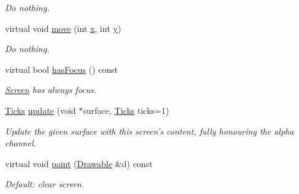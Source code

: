 \begin{DoxyCompactItemize}
\begin{DoxyCompactList}\small\item\em Do nothing. \end{DoxyCompactList}\item 
\hypertarget{classGUI_1_1Screen_a48a3586ad675d415de2baa45a5cf382d}{virtual void \hyperlink{classGUI_1_1Screen_a48a3586ad675d415de2baa45a5cf382d}{move} (int \hyperlink{classGUI_1_1Window_a6ca6a80ca00c9e1d8ceea8d3d99a657d}{x}, int \hyperlink{classGUI_1_1Window_a0ee8e923aff2c3661fc2e17656d37adf}{y})}\label{classGUI_1_1Screen_a48a3586ad675d415de2baa45a5cf382d}

\begin{DoxyCompactList}\small\item\em Do nothing. \end{DoxyCompactList}\item 
\hypertarget{classGUI_1_1Screen_a9bcce98285a1d8e359c2f81099697184}{virtual bool \hyperlink{classGUI_1_1Screen_a9bcce98285a1d8e359c2f81099697184}{has\-Focus} () const }\label{classGUI_1_1Screen_a9bcce98285a1d8e359c2f81099697184}

\begin{DoxyCompactList}\small\item\em \hyperlink{classGUI_1_1Screen}{Screen} has always focus. \end{DoxyCompactList}\item 
\hyperlink{namespaceGUI_af396fee5d5c26b98218f5803f85e3b65}{Ticks} \hyperlink{classGUI_1_1Screen_a921cee1496805709968c4e016a5af4e6}{update} (void $\ast$surface, \hyperlink{namespaceGUI_af396fee5d5c26b98218f5803f85e3b65}{Ticks} ticks=1)
\begin{DoxyCompactList}\small\item\em Update the given surface with this screen's content, fully honouring the alpha channel. \end{DoxyCompactList}\item 
\hypertarget{classGUI_1_1Screen_afa59a38d4f1fa75565c2bbfb699639be}{virtual void \hyperlink{classGUI_1_1Screen_afa59a38d4f1fa75565c2bbfb699639be}{paint} (\hyperlink{classGUI_1_1Drawable}{Drawable} \&d) const }\label{classGUI_1_1Screen_afa59a38d4f1fa75565c2bbfb699639be}

\begin{DoxyCompactList}\small\item\em Default\-: clear screen. \end{DoxyCompactList}\end{DoxyCompactItemize}
